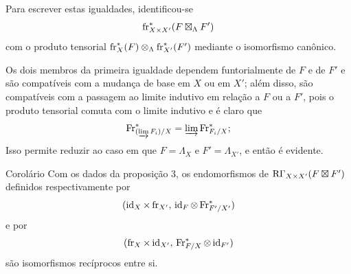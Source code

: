 Para escrever estas igualdades, identificou-se
\[
\operatorname{fr}_{X\times X'}^*(F\boxtimes_\Lambda F')
\]
com o produto tensorial $\operatorname{fr}_X^*(F)\otimes_\Lambda\operatorname{fr}_{X'}^*(F')$ mediante o isomorfismo canônico.

Os dois membros da primeira igualdade dependem funtorialmente de $F$ e de $F'$ e são compatíveis com a mudança de base em $X$ ou em $X'$; além disso, são compatíveis com a passagem ao limite indutivo em relação a $F$ ou a $F'$, pois o produto tensorial comuta com o limite indutivo e é claro que
\[
\operatorname{Fr}^*_{(\varinjlim F_i)/X}=\varinjlim\operatorname{Fr}^*_{F_i/X};
\]
Isso permite reduzir ao caso em que $F=\Lambda_X$ e $F'=\Lambda_{X'}$, e então é evidente.

\begin{statement}{Corolário}
Com os dados da proposição 3, os endomorfismos de $\mathrm{R}\Gamma_{X\times X'}(F\boxtimes F')$ definidos respectivamente por
\[
(\operatorname{id}_X\times\operatorname{fr}_{X'},\,\operatorname{id}_F\otimes\operatorname{Fr}^*_{F'/X'})
\]
e por
\[
(\operatorname{fr}_X\times\operatorname{id}_{X'},\,\operatorname{Fr}^*_{F/X}\otimes\operatorname{id}_{F'})
\]
são isomorfismos recíprocos entre si.
\end{statement}
